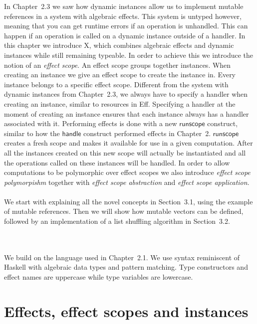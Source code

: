In Chapter~2.3 we saw how dynamic instances allow us to implement mutable references in a system with algebraic effects.
This system is untyped however, meaning that you can get runtime errors if an operation is unhandled.
This can happen if an operation is called on a dynamic instance outside of a handler.
In this chapter we introduce X, which combines algebraic effects and dynamic instances while still remaining typeable.
In order to achieve this we introduce the notion of an \emph{effect scope}.
An effect scope groups together instances.
When creating an instance we give an effect scope to create the instance in.
Every instance belongs to a specific effect scope.
Different from the system with dynamic instances from Chapter~2.3, we always have to specify a handler when creating an instance, similar to resources in Eff.
Specifying a handler at the moment of creating an instance ensures that each instance always has a handler associated with it.
Performing effects is done with a new $\mathsf{runscope}$ construct, similar to how the $\mathsf{handle}$ construct performed effects in Chapter~2.
$\mathsf{runscope}$ creates a fresh scope and makes it available for use in a given computation.
After all the instances created on this new scope will actually be instantiated and all the operations called on these instances will be handled.
In order to allow computations to be polymorphic over effect scopes we also introduce \emph{effect scope polymorpishm} together with \emph{effect scope abstraction} and \emph{effect scope application}.
\\\\
We start with explaining all the novel concepts in Section~3.1, using the example of mutable references.
Then we will show how mutable vectors can be defined, followed by an implementation of a list shuffling algorithm in Section~3.2.
\iffalse
We end the chapter by showing how our system allows for local effects in Section~3.3.
\fi
\\\\
We build on the language used in Chapter~2.1.
We use syntax reminiscent of Haskell with algebraic data types and pattern matching.
Type constructors and effect names are uppercase while type variables are lowercase.

\section{Effects, effect scopes and instances}
\label{section:basics}

